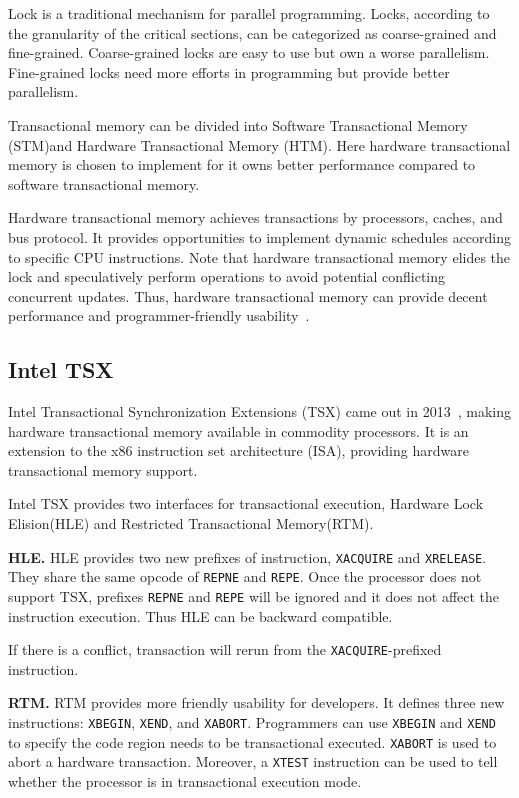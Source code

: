 \documentclass[10pt]{llncs}
\begin{document}
Lock is a traditional mechanism for parallel programming. Locks, according to the granularity of the critical sections, can be categorized as coarse-grained and fine-grained. Coarse-grained locks are easy to use but own a worse parallelism. Fine-grained locks need more efforts in programming but provide better parallelism.

Transactional memory can be divided into Software Transactional Memory (STM)and  Hardware Transactional Memory (HTM). Here hardware transactional memory is chosen to implement for it owns better performance compared to software transactional memory. 

Hardware transactional memory achieves transactions by processors, caches, and bus protocol\cite{Herlihy1993Transactional}. It provides opportunities to implement dynamic schedules according to specific CPU instructions. Note that hardware transactional memory elides the lock and speculatively perform operations to avoid potential conflicting concurrent updates. Thus, hardware transactional memory can provide decent performance and programmer-friendly usability~\cite{Karnagel2014Improving}.

\subsection{Intel TSX}
\label{back4}
Intel Transactional Synchronization Extensions (TSX) came out in 2013~\cite{Yoo2014Performance,Haas2014Enhancing,Goel2014Performance}, making hardware transactional memory available in commodity processors. It is an extension to the x86 instruction set architecture (ISA), providing hardware transactional memory support.

Intel TSX provides two interfaces for transactional execution, Hardware Lock Elision(HLE) and Restricted Transactional Memory(RTM).

\textbf{HLE.} HLE provides two new prefixes of instruction, \verb:XACQUIRE: and \verb:XRELEASE:. They share the same opcode of \verb:REPNE: and \verb:REPE:. Once the processor does not support TSX, prefixes \verb:REPNE: and \verb:REPE: will be ignored and it does not affect the instruction execution. Thus HLE can be backward compatible.

If there is a conflict, transaction will rerun from the \verb:XACQUIRE:-prefixed instruction.

\textbf{RTM.} RTM provides more friendly usability for developers. It defines three new instructions: \verb:XBEGIN:, \verb:XEND:, and \verb:XABORT:. Programmers can use \verb:XBEGIN: and \verb:XEND: to specify the code region needs to be transactional executed. \verb:XABORT: is used to abort a hardware transaction. Moreover, a \verb:XTEST: instruction can be used to tell whether the processor is in transactional execution mode.
\end{document}
